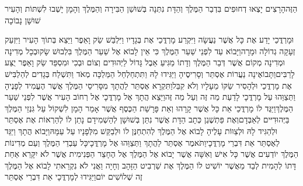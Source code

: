 \documentclass[../main/main.tex]{subfiles}
\begin{document}
\begin{multicols}{\ncols}
הַזֶּה\PreVerseSpace{}הָרָצִים יָצְאוּ דְחוּפִים בִּדְבַר הַמֶּלֶךְ וְהַדָּת נִתְּנָה בְּשׁוּשַׁן הַבִּירָה וְהַמֶּלֶךְ וְהָמָן יָשְׁבוּ לִשְׁתּוֹת וְהָעִיר שׁוּשָׁן נָבוֹכָה\OpenSection{}\par
{}וּמָרְדֳּכַי יָדַע אֶת כָּל אֲשֶׁר נַעֲשָׂה וַיִּקְרַע מָרְדֳּכַי אֶת בְּגָדָיו וַיִּלְבַּשׁ שַׂק וָאֵפֶר וַיֵּצֵא בְּתוֹךְ הָעִיר וַיִּזְעַק זְעָקָה גְדוֹלָה וּמָרָה\PreVerseSpace{}וַיָּבוֹא עַד לִפְנֵי שַׁעַר הַמֶּלֶךְ כִּי אֵין לָבוֹא אֶל שַׁעַר הַמֶּלֶךְ בִּלְבוּשׁ שָׂק\PreVerseSpace{}וּבְכָל מְדִינָה וּמְדִינָה מְקוֹם אֲשֶׁר דְּבַר הַמֶּלֶךְ וְדָתוֹ מַגִּיעַ אֵבֶל גָּדוֹל לַיְּהוּדִים וְצוֹם וּבְכִי וּמִסְפֵּד שַׂק וָאֵפֶר יֻצַּע לָרַבִּים\PreVerseSpace{}וַתָּבוֹאֶינָה נַעֲרוֹת אֶסְתֵּר וְסָרִיסֶיהָ וַיַּגִּידוּ לָהּ וַתִּתְחַלְחַל הַמַּלְכָּה מְאֹד וַתִּשְׁלַח בְּגָדִים לְהַלְבִּישׁ אֶת מָרְדֳּכַי וּלְהָסִיר שַׂקּוֹ מֵעָלָיו וְלֹא קִבֵּל\PreVerseSpace{}וַתִּקְרָא אֶסְתֵּר לַהֲתָךְ מִסָּרִיסֵי הַמֶּלֶךְ אֲשֶׁר הֶעֱמִיד לְפָנֶיהָ וַתְּצַוֵּהוּ עַל מָרְדֳּכָי לָדַעַת מַה זֶּה וְעַל מַה זֶּה\PreVerseSpace{}וַיֵּצֵא הֲתָךְ אֶל מָרְדֳּכָי אֶל רְחוֹב הָעִיר אֲשֶׁר לִפְנֵי שַׁעַר הַמֶּלֶךְ\PreVerseSpace{}וַיַּגֶּד לוֹ מָרְדֳּכַי אֵת כָּל אֲשֶׁר קָרָהוּ וְאֵת פָּרָשַׁת הַכֶּסֶף אֲשֶׁר אָמַר הָמָן לִשְׁקוֹל עַל גִּנְזֵי הַמֶּלֶךְ בַּיְּהוּדִיּים לְאַבְּדָם\PreVerseSpace{}וְאֶת פַּתְשֶׁגֶן כְּתָב הַדָּת אֲשֶׁר נִתַּן בְּשׁוּשָׁן לְהַשְׁמִידָם נָתַן לוֹ לְהַרְאוֹת אֶת אֶסְתֵּר וּלְהַגִּיד לָהּ וּלְצַוּוֹת עָלֶיהָ לָבוֹא אֶל הַמֶּלֶךְ לְהִתְחַנֶּן לוֹ וּלְבַקֵּשׁ מִלְּפָנָיו עַל עַמָּהּ\PreVerseSpace{}וַיָּבוֹא הֲתָךְ וַיַּגֵּד לְאֶסְתֵּר אֵת דִּבְרֵי מָרְדֳּכָי\PreVerseSpace{}וַתֹּאמֶר אֶסְתֵּר לַהֲתָךְ וַתְּצַוֵּהוּ אֶל מָרְדֳּכָי\PreVerseSpace{}כָּל עַבְדֵי הַמֶּלֶךְ וְעַם מְדִינוֹת הַמֶּלֶךְ יוֹדְעִים אֲשֶׁר כָּל אִישׁ וְאִשָּׁה אֲשֶׁר יָבוֹא אֶל הַמֶּלֶךְ אֶל הֶחָצֵר הַפְּנִימִית אֲשֶׁר לֹא יִקָּרֵא אַחַת דָּתוֹ לְהָמִית לְבַד מֵאֲשֶׁר יוֹשִׁיט לוֹ הַמֶּלֶךְ אֶת שַׁרְבִיט הַזָּהָב וְחָיָה וַאֲנִי לֹא נִקְרֵאתִי לָבוֹא אֶל הַמֶּלֶךְ זֶה שְׁלוֹשִׁים יוֹם\PreVerseSpace{}וַיַּגִּידוּ לְמָרְדֳּכָי אֵת דִּבְרֵי אֶסְתֵּר\OpenSection{}\par

\end{multicols}
\end{document}
